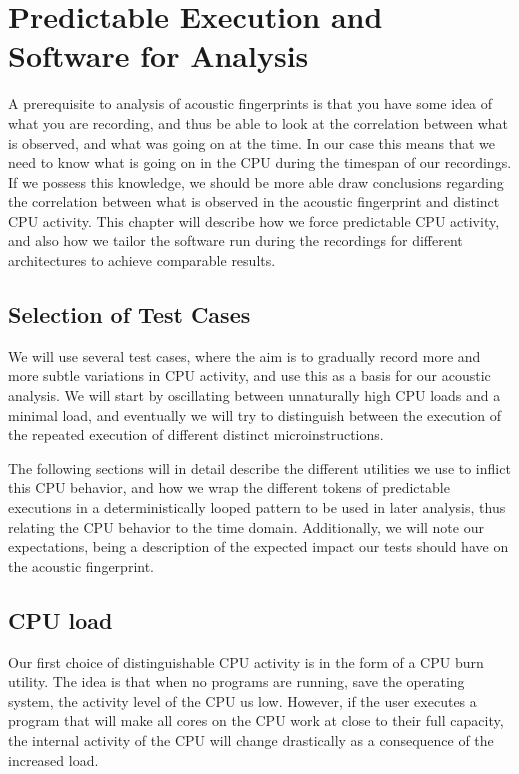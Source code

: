 \chapter{Predictable Execution and Software for Analysis}\label{chp:analyzing} 
A prerequisite to analysis of acoustic fingerprints is that you have some idea of what you are recording, and thus be able to look at the correlation between what is observed, and what was going on at the time.
In our case this means that we need to know what is going on in the CPU during the timespan of our recordings.
If we possess this knowledge, we should be more able draw conclusions regarding the correlation between what is observed in the acoustic fingerprint and distinct CPU activity.
This chapter will describe how we force predictable CPU activity, and also how we tailor the software run during the recordings for different architectures to achieve comparable results.

\section{Selection of Test Cases}
We will use several test cases, where the aim is to gradually record more and more subtle variations in CPU activity, and use this as a basis for our acoustic analysis.
We will start by oscillating between unnaturally high CPU loads and a minimal load, and eventually we will try to distinguish between the execution of the repeated execution of different distinct microinstructions.

The following sections will in detail describe the different utilities we use to inflict this CPU behavior, and how we wrap the different tokens of predictable executions in a deterministically looped pattern to be used in later analysis, thus relating the CPU behavior to the time domain. 
Additionally, we will note our expectations, being a description of the expected impact our tests should have on the acoustic fingerprint.

\section{CPU load}
Our first choice of distinguishable CPU activity is in the form of a CPU burn utility. 
The idea is that when no programs are running, save the operating system, the activity level of the CPU us low. 
However, if the user executes a program that will make all cores on the CPU work at close to their full capacity, the internal activity of the CPU will change drastically as a consequence of the increased load.

